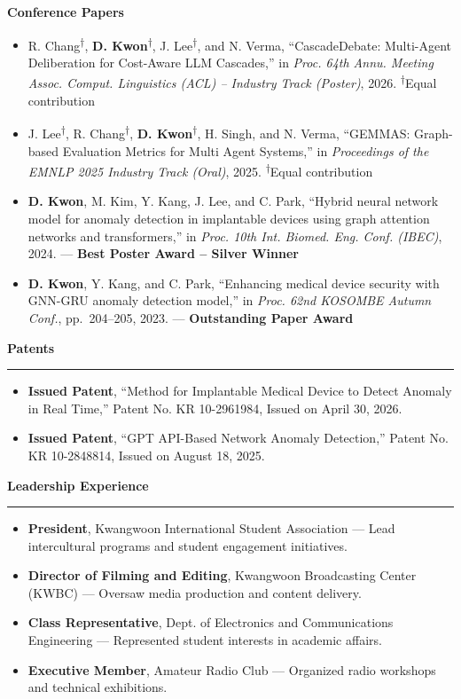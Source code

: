 \documentclass[11pt,letterpaper]{article}
\newcommand{\awesomesection}[2]{%
  \vspace{0.5em}\par\noindent
  {\fontsize{16pt}{18pt}\bfseries\color{awesomered}#1\color{ink}#2}%
  \par\vspace{-0.5em}%
  {\color{ink}\rule{\linewidth}{0.5pt}}\par
  \vspace{0.3em}%
}
\begin{document}
\textbf{Conference Papers}
\begin{itemize}
  \item R. Chang\textsuperscript{$\dagger$}, \textbf{D. Kwon}\textsuperscript{$\dagger$}, J. Lee\textsuperscript{$\dagger$}, and N. Verma, ``CascadeDebate: Multi-Agent Deliberation for Cost-Aware LLM Cascades,'' in \textit{Proc. 64th Annu. Meeting Assoc. Comput. Linguistics (ACL) -- Industry Track (Poster)}, 2026. \textsuperscript{$\dagger$}Equal contribution
  \item J. Lee\textsuperscript{$\dagger$}, R. Chang\textsuperscript{$\dagger$}, \textbf{D. Kwon}\textsuperscript{$\dagger$}, H. Singh, and N. Verma, ``GEMMAS: Graph-based Evaluation Metrics for Multi Agent Systems,'' in \textit{Proceedings of the EMNLP 2025 Industry Track (Oral)}, 2025. \textsuperscript{$\dagger$}Equal contribution
  \item \textbf{D. Kwon}, M. Kim, Y. Kang, J. Lee, and C. Park, ``Hybrid neural network model for anomaly detection in implantable devices using graph attention networks and transformers,'' in \textit{Proc. 10th Int. Biomed. Eng. Conf. (IBEC)}, 2024. --- \textbf{Best Poster Award -- Silver Winner}
  \item \textbf{D. Kwon}, Y. Kang, and C. Park, ``Enhancing medical device security with GNN-GRU anomaly detection model,'' in \textit{Proc. 62nd KOSOMBE Autumn Conf.}, pp.~204--205, 2023. --- \textbf{Outstanding Paper Award}
\end{itemize}

\awesomesection{Pat}{ents}

\begin{itemize}
  \item \textbf{Issued Patent}, ``Method for Implantable Medical Device to Detect Anomaly in Real Time,'' Patent No. KR 10-2961984, Issued on April 30, 2026.
  \item \textbf{Issued Patent}, ``GPT API-Based Network Anomaly Detection,'' Patent No. KR 10-2848814, Issued on August 18, 2025.
\end{itemize}

\awesomesection{Lea}{dership Experience}

\begin{itemize}
  \item \textbf{President}, Kwangwoon International Student Association --- Lead intercultural programs and student engagement initiatives.
  \item \textbf{Director of Filming and Editing}, Kwangwoon Broadcasting Center (KWBC) --- Oversaw media production and content delivery.
  \item \textbf{Class Representative}, Dept. of Electronics and Communications Engineering --- Represented student interests in academic affairs.
  \item \textbf{Executive Member}, Amateur Radio Club --- Organized radio workshops and technical exhibitions.
\end{itemize}
\end{document}
